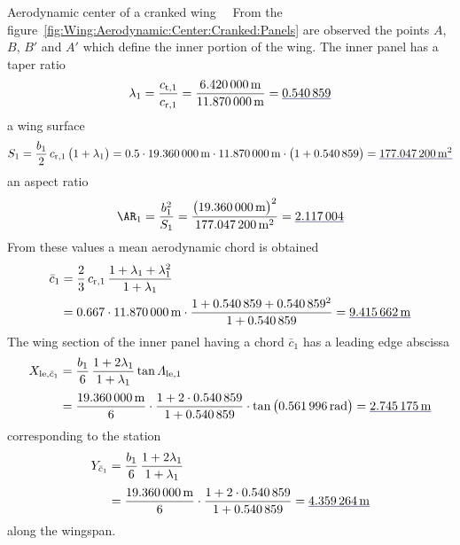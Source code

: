 \documentclass[[12pt,twoside]{book}
\begin{document}
\begin{myExampleX}{Aerodynamic center of a cranked wing}{\ \myIconGraph\ }
From the figure~\ref{fig:Wing:Aerodynamic:Center:Cranked:Panels} are observed
the points $A$, $B$, $B'$ and $A'$ which define the inner portion of the wing.
The inner panel has a taper ratio
\[
\lambda_1
  =\frac{c_{\mathrm{t},1}}{c_{\mathrm{r},1}}
  =\frac{\SI[round-precision=2]{\myChordTipWingIMT}{\metre}}{\SI[round-precision=2]{\myChordRootWingIMT}{\metre}}
  =\mathunderline{mydarkblue}{ \SI[round-precision=2]{\myTaperRatioWingI}{} }
\]
a wing surface
\[
S_1 = \frac{b_1}{2} \, c_{\mathrm{r},1} \, \big( 1 + \lambda_1 \big)
  =
    \num{0.5} \cdot \SI[round-precision=1]{\mySpanWingIMT}{\metre}
      \cdot \SI[round-precision=2]{\myChordRootWingIMT}{\metre}
      \cdot \big( 1 + \SI[round-precision=2]{\myTaperRatioWingI}{} \big) 
    = \mathunderline{mydarkblue}{ \SI[round-precision=0]{\myAreaWingIMTsquared}{\metre^2} }
\]
an aspect ratio
\[
\AR_1 
  = \frac{b_1^2}{S_1}
  = \frac{\big(\SI[round-precision=1]{\mySpanWingIMT}{\metre}\big)^2}{\SI[round-precision=1]{\myAreaWingIMTsquared}{\metre^2}}
  = \mathunderline{mydarkblue}{ \num[round-precision=2]{\myAspectRatioWingI} }
\]
From these values a mean aerodynamic chord is obtained
\[
\begin{split}
\bar{c}_1 & {}= \frac{2}{3} \, c_{\mathrm{r},1} \, \frac{1+\lambda_1 + \lambda_1^2}{1+\lambda_1} \\
  & {}=
    \num{0.667} \cdot \SI[round-precision=2]{\myChordRootWingIMT}{\metre}
      \cdot 
        \frac{
          1 + \SI[round-precision=2]{\myTaperRatioWingI}{} + \SI[round-precision=2]{\myTaperRatioWingI}{}^2
        }{
          1 + \SI[round-precision=2]{\myTaperRatioWingI}{}
        }
    = \mathunderline{mydarkblue}{ \SI[round-precision=2]{\myMACWingIMT}{\metre} }
\end{split}
\]
The wing section of the inner panel having a chord $\bar{c}_1$ has a leading edge
abscissa
\[
\begin{split}
X_{\mathrm{le},\bar{c}_1} 
  & {}=
    \frac{b_1}{6} \, \frac{1+2\lambda_1}{1+\lambda_1} \tan\Lambda_\mathrm{le,1} \\[3pt]
  & {}=
    \frac{\SI[round-precision=1]{\mySpanWingIMT}{\metre}}{6}
      \cdot 
      \frac{
        1 + 2\cdot\SI[round-precision=2]{\myTaperRatioWingI}{}
      }{
        1 + \SI[round-precision=2]{\myTaperRatioWingI}{}
      }
      \cdot \tan \big( \SI[round-precision=3]{\mySweepLEWingIRAD}{\radian} \big)
    = \mathunderline{mydarkblue}{ \SI[round-precision=2]{\myXMACLEToApexWingIMT}{\metre} }
\end{split}
\]
corresponding to the station
\[
\begin{split}
Y_{\bar{c}_1} 
  & {}=
    \frac{b_1}{6} \, \frac{1+2\lambda_1}{1+\lambda_1} \\[3pt]
  & {}=
    \frac{\SI[round-precision=1]{\mySpanWingIMT}{\metre}}{6}
      \cdot 
      \frac{
        1 + 2\cdot\SI[round-precision=2]{\myTaperRatioWingI}{}
      }{
        1 + \SI[round-precision=2]{\myTaperRatioWingI}{}
      }
    = \mathunderline{mydarkblue}{ \SI[round-precision=2]{\myYMACWingIMT}{\metre} }
\end{split}
\]
along the wingspan.


\end{myExampleX}
\end{document}
